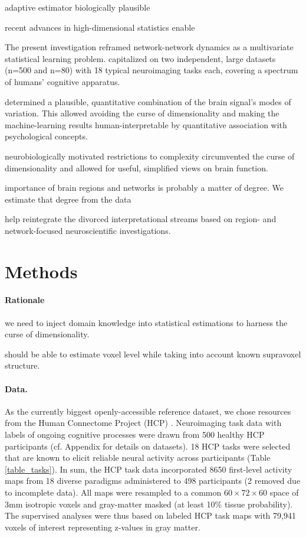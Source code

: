 \documentclass{article} %
\begin{document}
{adaptive estimator
biologically plausible

recent advances in high-dimensional statistics enable

The present investigation reframed network-network dynamics as a
multivariate statistical learning problem.
capitalized on two independent, large datasets (n=500 and n=80) with
18 typical neuroimaging tasks each, covering a spectrum of humans'
cognitive apparatus. 

determined a plausible, quantitative
combination of the brain signal's modes of variation. This allowed
avoiding the curse of dimensionality and making the machine-learning
results human-interpretable by quantitative association with
psychological concepts.

neurobiologically motivated restrictions to complexity circumvented
the curse of dimensionality and
allowed for useful, simplified views on brain function.

importance of brain regions and networks is probably a matter of
degree.
We estimate that degree from the data

help reintegrate the divorced
interpretational streams based on
region- and network-focused neuroscientific investigations.




\section{Methods}
%
\paragraph{Rationale}

we need to inject domain knowledge into
statistical estimations to harness the curse of dimensionality.


should be able to estimate voxel level
while taking into account known supravoxel structure.



%
\paragraph{Data.}
As the currently biggest openly-accessible reference dataset,
we chose resources from the Human Connectome Project (HCP)
\cite{barch2013}.
Neuroimaging task data with labels of ongoing cognitive processes
were drawn from 500
healthy HCP participants (cf. Appendix for details on datasets).
18 HCP tasks 
were selected that are known to elicit reliable neural activity
across participants (Table \ref{table_tasks}).
In sum, the HCP task data incorporated 8650 first-level activity maps
from 18 diverse paradigms administered to 498 participants (2 removed
due to incomplete data).
All maps were resampled to a common $60\times72\times60$ space of
3mm isotropic voxels and gray-matter masked (at least 10\% tissue
probability).
The supervised analyses were thus based on labeled HCP task maps with
79,941 voxels of interest representing z-values in gray matter.

}
\end{document}
